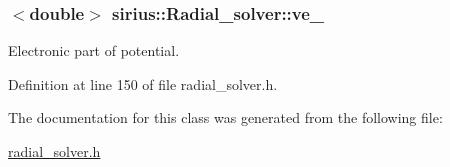 \hypertarget{classsirius_1_1_radial__solver_a8766ca2d2e048ee1e4451940ceb7f0a7}{}
\subsubsection[{ve\+\_\+}]{$<$double$>$ sirius\+::\+Radial\+\_\+solver\+::ve\+\_\+\hspace{0.3cm}{\ttfamily [protected]}}\label{classsirius_1_1_radial__solver_a8766ca2d2e048ee1e4451940ceb7f0a7}


Electronic part of potential. 



Definition at line 150 of file radial\+\_\+solver.\+h.



The documentation for this class was generated from the following file\+:\begin{DoxyCompactItemize}
\item 
\hyperlink{radial__solver_8h}{radial\+\_\+solver.\+h}\end{DoxyCompactItemize}
